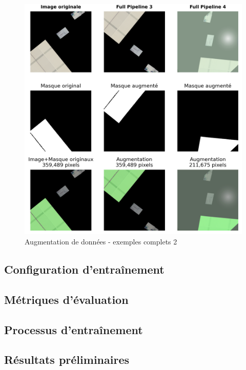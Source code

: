 \begin{figure}[H]
    \centering
    \includegraphics[width=1\linewidth]{02-main/figures/ch3/ch36_augmentations_15_exemples_complets2.png}
    \caption{Augmentation de données - exemples complets 2}
    \label{fig:ch36_augmentations_15_exemples_complets2}
\end{figure}



\subsection{Configuration d'entraînement} %
\subsection{Métriques d'évaluation} %
\subsection{Processus d'entraînement} %
\subsection{Résultats préliminaires}
\newpage
